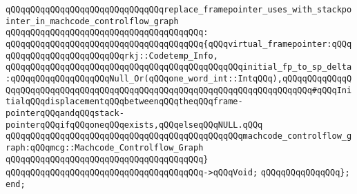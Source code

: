 \newline
\newline
\verb|qQQqqQQqqQQqqQQqqQQqqQQqqQQqqQQqreplace_framepointer_uses_with_stackpointer_in_machcode_controlflow_graph|\newline
\verb|qQQqqQQqqQQqqQQqqQQqqQQqqQQqqQQqqQQqqQQq:|\newline
\verb|qQQqqQQqqQQqqQQqqQQqqQQqqQQqqQQqqQQqqQQq{qQQqvirtual_framepointer:qQQqqQQqqQQqqQQqqQQqqQQqqQQqrkj::Codetemp_Info,|\newline
\verb|qQQqqQQqqQQqqQQqqQQqqQQqqQQqqQQqqQQqqQQqqQQqqQQqinitial_fp_to_sp_delta:qQQqqQQqqQQqqQQqqQQqNull_Or(qQQqone_word_int::IntqQQq),qQQqqQQqqQQqqQQqqQQqqQQqqQQqqQQqqQQqqQQqqQQqqQQqqQQqqQQqqQQqqQQqqQQqqQQqqQQq#qQQqInitialqQQqdisplacementqQQqbetweenqQQqtheqQQqframe-pointerqQQqandqQQqstack-pointerqQQqifqQQqoneqQQqexists,qQQqelseqQQqNULL.qQQq|\newline
\verb|qQQqqQQqqQQqqQQqqQQqqQQqqQQqqQQqqQQqqQQqqQQqqQQqmachcode_controlflow_graph:qQQqmcg::Machcode_Controlflow_Graph|\newline
\verb|qQQqqQQqqQQqqQQqqQQqqQQqqQQqqQQqqQQqqQQq}|\newline
\verb|qQQqqQQqqQQqqQQqqQQqqQQqqQQqqQQqqQQqqQQq->qQQqVoid;|\newline
\verb|qQQqqQQqqQQqqQQq};|\newline
\verb|end;|\newline


